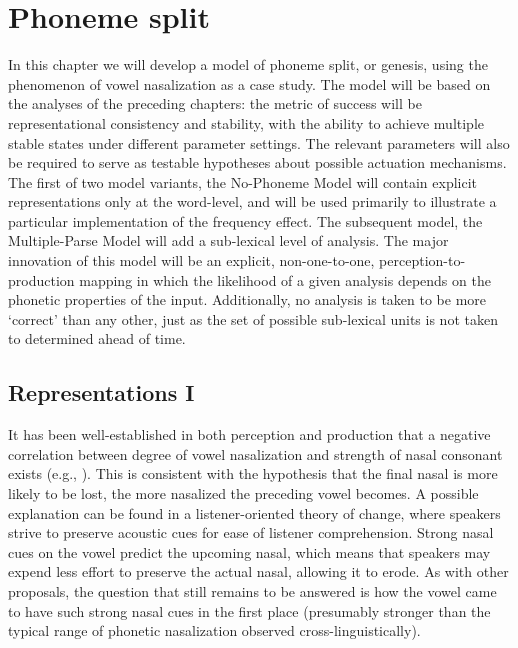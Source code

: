 \chapter{Phoneme split}\label{ch:Phoneme-Split}

In this chapter we will develop a model of phoneme split, or genesis,
using the phenomenon of vowel nasalization as a case study. The model
will be based on the analyses of the preceding chapters: the metric
of success will be representational consistency and stability, with
the ability to achieve multiple stable states under different parameter
settings. The relevant parameters will also be required to serve as
testable hypotheses about possible actuation mechanisms. The first
of two model variants, the No-Phoneme Model will contain explicit
representations only at the word-level, and will be used primarily
to illustrate a particular implementation of the frequency effect.
The subsequent model, the Multiple-Parse Model will add a sub-lexical
level of analysis. The major innovation of this model will be an explicit,
non-one-to-one, perception-to-production mapping in which the likelihood
of a given analysis depends on the phonetic properties of the input.
Additionally, no analysis is taken to be more `correct' than any other,
just as the set of possible sub-lexical units is not taken to determined
ahead of time.

\section{Representations I}

It has been well-established in both perception and production that
a negative correlation between degree of vowel nasalization and strength
of nasal consonant exists (e.g., \citealt{kawasaki1978perceived,cohn1990phonetic}).
This is consistent with the hypothesis that the final nasal is more
likely to be lost, the more nasalized the preceding vowel becomes.
A possible explanation can be found in a listener-oriented theory
of change, where speakers strive to preserve acoustic cues for ease
of listener comprehension. Strong nasal cues on the vowel predict
the upcoming nasal, which means that speakers may expend less effort
to preserve the actual nasal, allowing it to erode. As with other
proposals, the question that still remains to be answered is how the
vowel came to have such strong nasal cues in the first place (presumably
stronger than the typical range of phonetic nasalization observed
cross-linguistically). 

